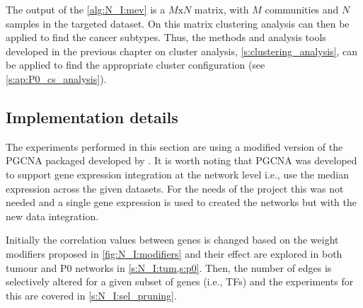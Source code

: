 The output of the \cref{alg:N_I:mev} is a $M\text{x}N$ matrix, with $M$ communities and $N$ samples in the targeted dataset. On this matrix clustering analysis can then be applied to find the cancer subtypes. Thus, the methods and analysis tools developed in the previous chapter on cluster analysis, \cref{s:clustering_analysis}, can be applied to find the appropriate cluster configuration (see \cref{s:ap:P0_cs_analysis}).


\subsection{Implementation details} \label{s:N_I:implementation}

The experiments performed in this section are using a modified version of the PGCNA packaged developed by \citet{Care2019-ij}. It is worth noting that PGCNA was developed to support gene expression integration at the network level i.e., use the median expression across the given datasets. For the needs of the project this was not needed and a single gene expression is used to created the networks but with the new data integration. 

Initially the correlation values between genes is changed based on the weight modifiers proposed in \cref{fig:N_I:modifiers} and their effect are explored in both tumour and P0 networks in \cref{s:N_I:tum,s:p0}. Then, the number of edges is selectively altered for a given subset of genes (i.e., TFs) and the experiments for this are covered in \cref{s:N_I:sel_pruning}. 





